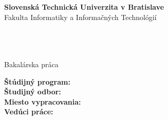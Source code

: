 \begin{center}
\newpage
\thispagestyle{empty}


{\Large \bf Slovenská Technická Univerzita v Bratislave}\\[\baselineskip]
{\large Fakulta Informatiky a Informačných Technológií}

\noindent\makebox[\linewidth]{\rule{\textwidth}{1pt}} 


\hspace{0.5cm}

{\large \bf \FIIT}\\
\vspace*{4.5cm}
{\Large \Author}\\[\baselineskip]
{\huge \bf \Titlesk}\\[\baselineskip]
{\large Bakalárska práca}\\

\end{center}
\vspace{4.0cm}
{\bf Štúdijný program:} \Programsk\\ 
{\bf Študijný odbor:} \Fieldsk\\
{\bf Miesto vypracovania:} \Placesk\\
{\bf Vedúci práce:} \Supervisor \\ \\
\Monthsk    \Year